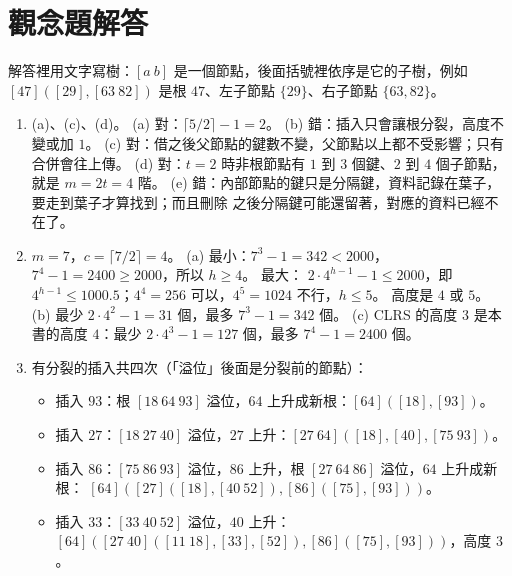 \section*{觀念題解答}

解答裡用文字寫樹：$[a\ b]$ 是一個節點，後面括號裡依序是它的子樹，例如
$[47]([29],[63\ 82])$ 是根 $47$、左子節點 $\{29\}$、右子節點 $\{63, 82\}$。

\begin{enumerate}
\item (a)、(c)、(d)。
(a) 對：$\lceil 5/2 \rceil - 1 = 2$。 (b) 錯：插入只會讓根分裂，高度不變或加 $1$。
(c) 對：借之後父節點的鍵數不變，父節點以上都不受影響；只有合併會往上傳。
(d) 對：$t = 2$ 時非根節點有 $1$ 到 $3$ 個鍵、$2$ 到 $4$ 個子節點，就是 $m = 2t = 4$
階。 (e) 錯：內部節點的鍵只是分隔鍵，資料記錄在葉子，要走到葉子才算找到；而且刪除
之後分隔鍵可能還留著，對應的資料已經不在了。

\item $m = 7$，$c = \lceil 7/2 \rceil = 4$。
(a) 最小：$7^3 - 1 = 342 < 2000$，$7^4 - 1 = 2400 \ge 2000$，所以 $h \ge 4$。 最大：
$2 \cdot 4^{h-1} - 1 \le 2000$，即 $4^{h-1} \le 1000.5$；$4^4 = 256$ 可以，$4^5 = 1024$
不行，$h \le 5$。 高度是 $4$ 或 $5$。
(b) 最少 $2 \cdot 4^2 - 1 = 31$ 個，最多 $7^3 - 1 = 342$ 個。
(c) CLRS 的高度 $3$ 是本書的高度 $4$：最少 $2 \cdot 4^3 - 1 = 127$ 個，最多
$7^4 - 1 = 2400$ 個。

\item 有分裂的插入共四次（「溢位」後面是分裂前的節點）：
\begin{itemize}
\item 插入 $93$：根 $[18\ 64\ 93]$ 溢位，$64$ 上升成新根：$[64]([18],\allowbreak[93])$。
\item 插入 $27$：$[18\ 27\ 40]$ 溢位，$27$ 上升：$[27\ 64]([18],\allowbreak[40],\allowbreak[75\ 93])$。
\item 插入 $86$：$[75\ 86\ 93]$ 溢位，$86$ 上升，根 $[27\ 64\ 86]$ 溢位，$64$ 上升成新根：
$[64]([27]([18],\allowbreak[40\ 52]),[86]([75],\allowbreak[93]))$。
\item 插入 $33$：$[33\ 40\ 52]$ 溢位，$40$ 上升：
$[64]([27\ 40]([11\ 18],\allowbreak[33],\allowbreak[52]),[86]([75],\allowbreak[93]))$，高度 $3$。
\end{itemize}


\end{enumerate}

